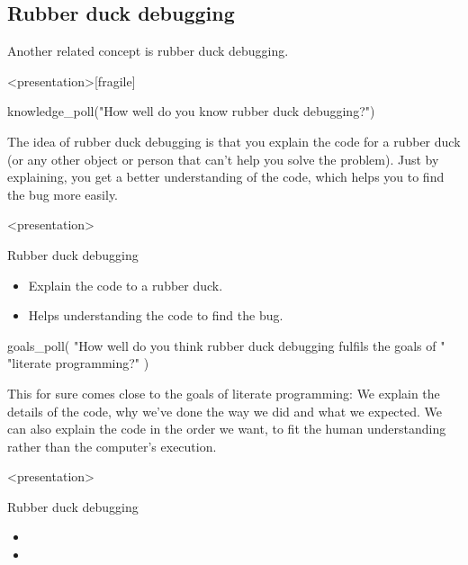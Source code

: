 \subsection{Rubber duck debugging}

Another related concept is rubber duck debugging.

\begin{frame}<presentation>[fragile]
\begin{activity}
\begin{pycode}
knowledge_poll("How well do you know rubber duck debugging?")
\end{pycode}
\end{activity}
\end{frame}

The idea of rubber duck debugging is that you explain the code for a rubber 
duck (or any other object or person that can't help you solve the problem).
Just by explaining, you get a better understanding of the code, which helps you 
to find the bug more easily.

\begin{frame}<presentation>
\begin{block}{Rubber duck debugging}
  \begin{itemize}
    \item Explain the code to a rubber duck.
    \item Helps understanding the code to find the bug.
  \end{itemize}
\end{block}
\end{frame}

\begin{frame}[fragile]
\begin{activity}
\begin{pycode}
goals_poll(
    "How well do you think rubber duck debugging fulfils the goals of "
    "literate programming?"
)
\end{pycode}
\end{activity}
\end{frame}

This for sure comes close to the goals of literate programming:
We explain the details of the code, why we've done the way we did and what we 
expected.
We can also explain the code in the order we want, to fit the human 
understanding rather than the computer's execution.

\begin{frame}<presentation>
\begin{block}{Rubber duck debugging}
  \begin{itemize}
    \item[\(+\)] {\color{green!75!black}\LPexplain}
    \item[\(+\)] {\color{green!75!black}\LPorder}
  \end{itemize}
\end{block}
\end{frame}

